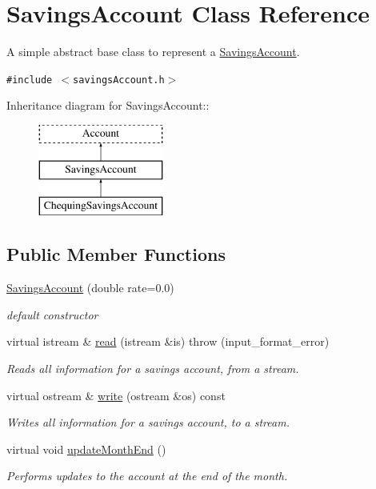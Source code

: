 \hypertarget{classSavingsAccount}{
\section{SavingsAccount Class Reference}
\label{classSavingsAccount}
}
A simple abstract base class to represent a \hyperlink{classSavingsAccount}{SavingsAccount}.  


{\tt \#include $<$savingsAccount.h$>$}

Inheritance diagram for SavingsAccount::\begin{figure}[H]
\begin{center}
\leavevmode
\includegraphics[height=3cm]{classSavingsAccount}
\end{center}
\end{figure}
\subsection*{Public Member Functions}
\begin{CompactItemize}
\item 
\hyperlink{classSavingsAccount_b7517ac4a985dc029f2587109c984482}{SavingsAccount} (double rate=0.0)
\begin{CompactList}\small\item\em default constructor \item\end{CompactList}\item 
virtual istream \& \hyperlink{classSavingsAccount_a738133ea37093f4e0ae9d3a6dc14674}{read} (istream \&is)  throw (input\_\-format\_\-error)
\begin{CompactList}\small\item\em Reads all information for a savings account, from a stream. \item\end{CompactList}\item 
virtual ostream \& \hyperlink{classSavingsAccount_7010b1663ff729cb05a3594c7bc8ae99}{write} (ostream \&os) const 
\begin{CompactList}\small\item\em Writes all information for a savings account, to a stream. \item\end{CompactList}\item 
virtual void \hyperlink{classSavingsAccount_fedffc6bb917570025ac1e30db9e4f76}{updateMonthEnd} ()
\begin{CompactList}\small\item\em Performs updates to the account at the end of the month. \item\end{CompactList}\end{CompactItemize}
